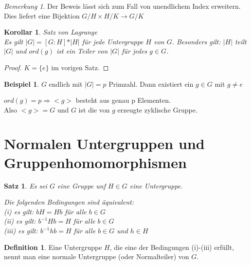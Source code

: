 \documentclass[12pt]{scrartcl}%
\newtheorem{thm}{Satz}
\newtheorem{kor}{Korollar}
\theoremstyle{definition}
\newtheorem*{defn}{Definition}
\newtheorem{ex}{Beispiel}
\theoremstyle{remark}
\newtheorem*{nb}{Bemerkung}
\begin{document}
\begin{nb}
Der Beweis lässt sich zum Fall von unendlichem Index erweitern. Dies liefert eine Bijektion $G/H \times H/K \to G/K$
\end{nb}

\begin{kor}{Satz von Lagrange}\\
Es gilt $\vert G\vert = [G:H]*\vert H\vert$ für jede Untergruppe  $H$ von $G$. Besonders gilt: $\vert H\vert$ teilt $\vert G\vert$ und $ord(g)$ ist ein Teiler von  $\vert G\vert$ für jedes $g\in G$.
\end{kor}

\begin{proof}
$K= \{ e\}$ im vorigen Satz.
\end{proof}

\begin{ex}
$G$ endlich mit $\vert G\vert=p$ Primzahl. Dann existiert ein $g \in G$ mit $g \neq e$

$ord(g)=p \Rightarrow <g>$ besteht aus genau p Elementen.\\
Also $<g>=G$ und $G$ ist die von $g$ erzeugte zyklische Gruppe.
\end{ex}

\section{Normalen Untergruppen und Gruppenhomomorphismen}

\begin{thm}
Es sei $G$ eine Gruppe unf $H\in G$ eine Untergruppe.

Die folgenden Bedingungen sind {\"a}quivalent:\\
(i) es gilt: $bH=Hb$ für alle $b\in G$\\
(ii) es gilt: $b^{-1}Hb=H$ für alle $b\in G$\\
(iii) es gilt: $b^{-1}hb=H$ für alle $b\in G$ und $h\in H$
\end{thm}

\begin{defn}
Eine Untergruppe $H$, die eine der Bedingungen (i)-(iii) erfüllt, nennt man eine normale Untergruppe (oder Normalteiler) von $G$.
\end{defn}
\end{document}

